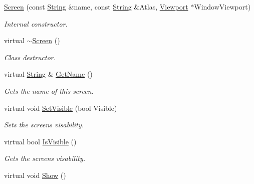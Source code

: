 \begin{DoxyCompactItemize}
\item 
\hyperlink{classphys_1_1UI_1_1Screen_a920ce661a018a590b5cc5e2f4acf4614}{Screen} (const \hyperlink{namespacephys_aa03900411993de7fbfec4789bc1d392e}{String} \&name, const \hyperlink{namespacephys_aa03900411993de7fbfec4789bc1d392e}{String} \&Atlas, \hyperlink{classphys_1_1Viewport}{Viewport} $\ast$WindowViewport)
\begin{DoxyCompactList}\small\item\em Internal constructor. \item\end{DoxyCompactList}\item 
\hypertarget{classphys_1_1UI_1_1Screen_a9dbaf96f9a8d13b943833609a94b0aa9}{
virtual \hyperlink{classphys_1_1UI_1_1Screen_a9dbaf96f9a8d13b943833609a94b0aa9}{$\sim$Screen} ()}
\label{classphys_1_1UI_1_1Screen_a9dbaf96f9a8d13b943833609a94b0aa9}

\begin{DoxyCompactList}\small\item\em Class destructor. \item\end{DoxyCompactList}\item 
virtual \hyperlink{namespacephys_aa03900411993de7fbfec4789bc1d392e}{String} \& \hyperlink{classphys_1_1UI_1_1Screen_a25429da07fa8f04a3183265bd8c5d3d7}{GetName} ()
\begin{DoxyCompactList}\small\item\em Gets the name of this screen. \item\end{DoxyCompactList}\item 
virtual void \hyperlink{classphys_1_1UI_1_1Screen_a033c0c85ef325148c7f9e8969000a98b}{SetVisible} (bool Visible)
\begin{DoxyCompactList}\small\item\em Sets the screens visability. \item\end{DoxyCompactList}\item 
virtual bool \hyperlink{classphys_1_1UI_1_1Screen_a8dd7698cd4b0d8760c7af7eb835eef48}{IsVisible} ()
\begin{DoxyCompactList}\small\item\em Gets the screens visability. \item\end{DoxyCompactList}\item 
\hypertarget{classphys_1_1UI_1_1Screen_a8f8c0a690b7df72bceb36f3346395389}{
virtual void \hyperlink{classphys_1_1UI_1_1Screen_a8f8c0a690b7df72bceb36f3346395389}{Show} ()}
\label{classphys_1_1UI_1_1Screen_a8f8c0a690b7df72bceb36f3346395389}


\end{DoxyCompactItemize}
